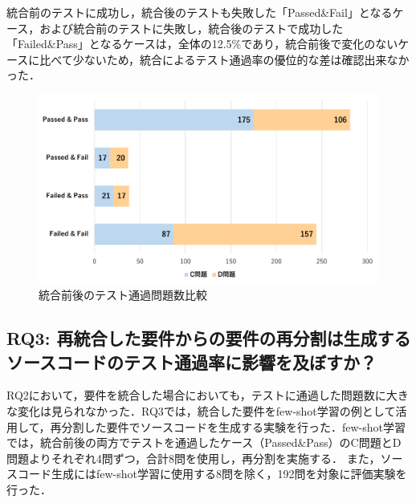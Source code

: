 \documentclass[submit,techrep,noauthor]{ipsj}
\newcommand{\ihara}[1]{\colorbox{green}{{\bf IHARA}:}{\color{blue} {\textbf{[#1]}}}}
\begin{document}
統合前のテストに成功し，統合後のテストも失敗した「Passed\&Fail」となるケース，および統合前のテストに失敗し，統合後のテストで成功した「Failed\&Pass」となるケースは，全体の12.5\%であり，統合前後で変化のないケースに比べて少ないため，統合によるテスト通過率の優位的な差は確認出来なかった．



\begin{figure}[t]
    \centering
    \includegraphics[width=1.0\linewidth]{./Toyoshima_fig/SIGSE_PF.pdf}
    \caption{統合前後のテスト通過問題数比較}
    \label{rq2_1}
\end{figure}


\subsection{RQ3: 再統合した要件からの要件の再分割は生成するソースコードのテスト通過率に影響を及ぼすか？}

RQ2において，要件を統合した場合においても，テストに通過した問題数に大きな変化は見られなかった．RQ3では，統合した要件をfew-shot学習の例として活用して，再分割した要件でソースコードを生成する実験を行った．few-shot学習では，統合前後の両方でテストを通過したケース（Passed\&Pass）のC問題とD問題よりそれぞれ4問ずつ，合計8問を使用し，再分割を実施する．
また，ソースコード生成にはfew-shot学習に使用する8問を除く，192問を対象に評価実験を行った．
\end{document}
